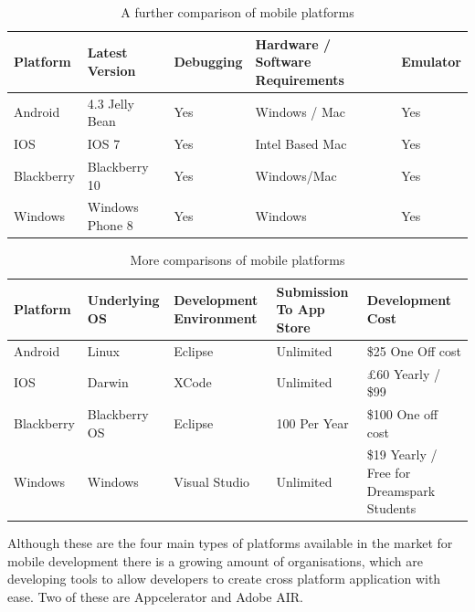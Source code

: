 \begin{table}[H]
    \centering
    \begin{tabular}{|p{2cm}|p{3.5cm}|p{2.2cm}|p{4.5cm}|p{2cm}|}
    \hline
    \textbf{Platform}   & \textbf{Latest Version}    & \textbf{Debugging} & \textbf{Hardware / Software Requirements} & \textbf{Emulator} \\ \hline
    Android    & 4.3 Jelly   Bean  & Yes       & Windows   / Mac & Yes \\ \hline
    IOS        & IOS 7             & Yes       & Intel   Based Mac               & Yes  \\ \hline
    Blackberry & Blackberry   10   & Yes       & Windows/Mac                     & Yes \\ \hline
    Windows    & Windows   Phone 8 & Yes       & Windows                         & Yes \\ \hline
    \end{tabular}
    \caption {A further comparison of mobile platforms}
\end{table}

\begin{table}[H]
    \centering
    \begin{tabular}{|p{2cm}|p{2.2cm}|p{3cm}|p{3cm}|p{4cm}|}
    \hline
        \textbf{Platform}   & \textbf{Underlying OS} &     \textbf{Development Environment}  &   \textbf{Submission To App Store} & \textbf{Development Cost}                            \\ \hline
        Android    &   Linux       & Eclipse                      &   Unlimited               & \$25 One Off cost                            \\ \hline
        IOS        & Darwin        & XCode                        &   Unlimited               & \pounds60 Yearly / \$99                            \\ \hline
        Blackberry & Blackberry OS & Eclipse                      & 100 Per Year              & \$100 One off cost                           \\ \hline
        Windows    & Windows       &   Visual Studio              & Unlimited                 & \$19 Yearly / Free for Dreamspark   Students \\ \hline
    \end{tabular}
    \caption {More comparisons of mobile platforms}
\end{table}

Although these are the four main types of platforms available in the market for mobile development there is a growing amount of organisations, which are developing tools to allow developers to create cross platform application with ease. Two of these are Appcelerator and Adobe AIR.

